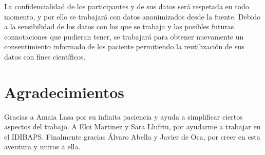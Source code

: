 \documentclass[fleqn,12pt]{UICArticle} %
\begin{document}
La confidencialidad de los participantes y de sus datos será respetada en todo momento, y por ello se trabajará con datos anonimizados desde la fuente. Debido a la sensibilidad de los datos con los que se trabaja y las posibles futuras connotaciones que pudieran tener, se trabajará para obtener nuevamente un consentimiento informado de los paciente permitiendo la reutilización de sus datos con fines científicos.


\section*{Agradecimientos}
Gracias a Amaia Lasa por su infinita paciencia y ayuda a simplificar ciertos aspectos del trabajo. A Eloi Martinez y Sara Llufriu, por ayudarme a trabajar en el IDIBAPS. Finalmente gracias Álvaro Abella y Javier de Oca, por creer en esta aventura y uniros a ella.
\endgroup






\end{document}

